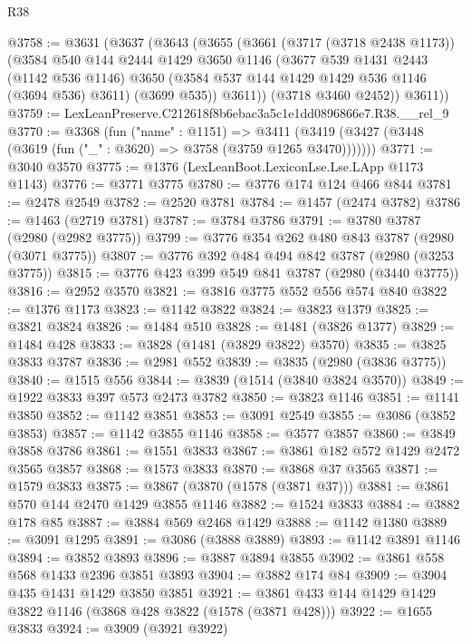 \begin{lexlean}{R38}
\begin{coremodule}
@3758 := @3631
    (@3637
      (@3643
        (@3655
          (@3661
            (@3717 (@3718 @2438 @1173))
            (@3584
              @540
              @144
              @2444
              @1429
              @3650
              @1146
              (@3677
                @539
                @1431
                @2443
                (@1142 @536 @1146)
                @3650
                (@3584 @537 @144 @1429 @1429 @536 @1146 (@3694 @536) @3611)
                (@3699 @535))
              @3611))
          (@3718 @3460 @2452))
        @3611))
@3759 := LexLeanPreserve.C212618f8b6ebac3a5c1e1dd0896866e7.R38.__rel_9
@3770 := @3368
    (fun ("name" : @1151) =>
    @3411 (@3419 (@3427 (@3448 (@3619 (fun ("_" : @3620) => @3758 (@3759 @1265 @3470)))))))
@3771 := @3040 @3570
@3775 := @1376 (LexLeanBoot.LexiconLse.Lse.LApp @1173 @1143)
@3776 := @3771 @3775
@3780 := @3776 @174 @124 @466 @844
@3781 := @2478 @2549
@3782 := @2520 @3781
@3784 := @1457 (@2474 @3782)
@3786 := @1463 (@2719 @3781)
@3787 := @3784 @3786
@3791 := @3780 @3787 (@2980 (@2982 @3775))
@3799 := @3776 @354 @262 @480 @843 @3787 (@2980 (@3071 @3775))
@3807 := @3776 @392 @484 @494 @842 @3787 (@2980 (@3253 @3775))
@3815 := @3776 @423 @399 @549 @841 @3787 (@2980 (@3440 @3775))
@3816 := @2952 @3570
@3821 := @3816 @3775 @552 @556 @574 @840
@3822 := @1376 @1173
@3823 := @1142 @3822
@3824 := @3823 @1379
@3825 := @3821 @3824
@3826 := @1484 @510
@3828 := @1481 (@3826 @1377)
@3829 := @1484 @428
@3833 := @3828 (@1481 (@3829 @3822) @3570)
@3835 := @3825 @3833 @3787
@3836 := @2981 @552
@3839 := @3835 (@2980 (@3836 @3775))
@3840 := @1515 @556
@3844 := @3839 (@1514 (@3840 @3824 @3570))
@3849 := @1922 @3833 @397 @573 @2473 @3782
@3850 := @3823 @1146
@3851 := @1141 @3850
@3852 := @1142 @3851
@3853 := @3091 @2549
@3855 := @3086 (@3852 @3853)
@3857 := @1142 @3855 @1146
@3858 := @3577 @3857
@3860 := @3849 @3858 @3786
@3861 := @1551 @3833
@3867 := @3861 @182 @572 @1429 @2472 @3565 @3857
@3868 := @1573 @3833
@3870 := @3868 @37 @3565
@3871 := @1579 @3833
@3875 := @3867 (@3870 (@1578 (@3871 @37)))
@3881 := @3861 @570 @144 @2470 @1429 @3855 @1146
@3882 := @1524 @3833
@3884 := @3882 @178 @85
@3887 := @3884 @569 @2468 @1429
@3888 := @1142 @1380
@3889 := @3091 @1295
@3891 := @3086 (@3888 @3889)
@3893 := @1142 @3891 @1146
@3894 := @3852 @3893
@3896 := @3887 @3894 @3855
@3902 := @3861 @558 @568 @1433 @2396 @3851 @3893
@3904 := @3882 @174 @84
@3909 := @3904 @435 @1431 @1429 @3850 @3851
@3921 := @3861 @433 @144 @1429 @1429 @3822 @1146 (@3868 @428 @3822 (@1578 (@3871 @428)))
@3922 := @1655 @3833
@3924 := @3909 (@3921 @3922)

\end{coremodule}
\end{lexlean}
